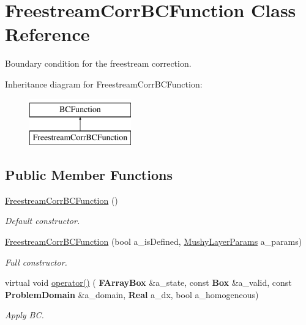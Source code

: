 \hypertarget{class_freestream_corr_b_c_function}{}\section{Freestream\+Corr\+B\+C\+Function Class Reference}
\label{class_freestream_corr_b_c_function}


Boundary condition for the freestream correction.  


Inheritance diagram for Freestream\+Corr\+B\+C\+Function\+:\begin{figure}[H]
\begin{center}
\leavevmode
\includegraphics[height=2.000000cm]{class_freestream_corr_b_c_function}
\end{center}
\end{figure}
\subsection*{Public Member Functions}
\begin{DoxyCompactItemize}
\item 
\mbox{\label{class_freestream_corr_b_c_function_a172724d0d72e728a531a314bdf487eff}} 
\hyperlink{class_freestream_corr_b_c_function_a172724d0d72e728a531a314bdf487eff}{Freestream\+Corr\+B\+C\+Function} ()
\begin{DoxyCompactList}\small\item\em Default constructor. \end{DoxyCompactList}\item 
\mbox{\label{class_freestream_corr_b_c_function_a6ef77a0c95d316d78af7a43d01f18fce}} 
\hyperlink{class_freestream_corr_b_c_function_a6ef77a0c95d316d78af7a43d01f18fce}{Freestream\+Corr\+B\+C\+Function} (bool a\+\_\+is\+Defined, \hyperlink{class_mushy_layer_params}{Mushy\+Layer\+Params} a\+\_\+params)
\begin{DoxyCompactList}\small\item\em Full constructor. \end{DoxyCompactList}\item 
\mbox{\label{class_freestream_corr_b_c_function_a3d1570440733a0cdc9eeb853774d0f60}} 
virtual void \hyperlink{class_freestream_corr_b_c_function_a3d1570440733a0cdc9eeb853774d0f60}{operator()} (\textbf{ F\+Array\+Box} \&a\+\_\+state, const \textbf{ Box} \&a\+\_\+valid, const \textbf{ Problem\+Domain} \&a\+\_\+domain, \textbf{ Real} a\+\_\+dx, bool a\+\_\+homogeneous)
\begin{DoxyCompactList}\small\item\em Apply BC. \end{DoxyCompactList}\end{DoxyCompactItemize}
